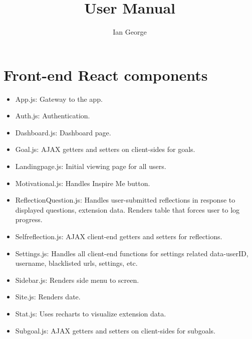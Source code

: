\documentclass[letterpaper, 10 pt]{report}
\begin{document}
\title{User Manual}
\author{Ian George}
\maketitle
\pagestyle{empty}

\tableofcontents
\newpage

\section{Front-end React components}
\begin{itemize}
\item App.js: Gateway to the app.
\item Auth.js: Authentication.
\item Dashboard.js: Dashboard page.
\item Goal.js: AJAX getters and setters on client-sides for goals.
\item Landingpage.js: Initial viewing page for all users.
\item Motivational.js: Handles Inspire Me button.
\item ReflectionQuestion.js: Handles user-submitted reflections in response to displayed questions, extension data. Renders table that forces user to log progress.
\item Selfreflection.js: AJAX client-end getters and setters for reflections.
\item Settings.js: Handles all client-end functions for settings related data-userID, username, blacklisted urls, settings, etc.
\item Sidebar.js: Renders side menu to screen.
\item Site.js: Renders date.
\item Stat.js: Uses recharts to visualize extension data.
\item Subgoal.js: AJAX getters and setters on client-sides for subgoals.
\end{itemize}


\newpage

\end{document}
